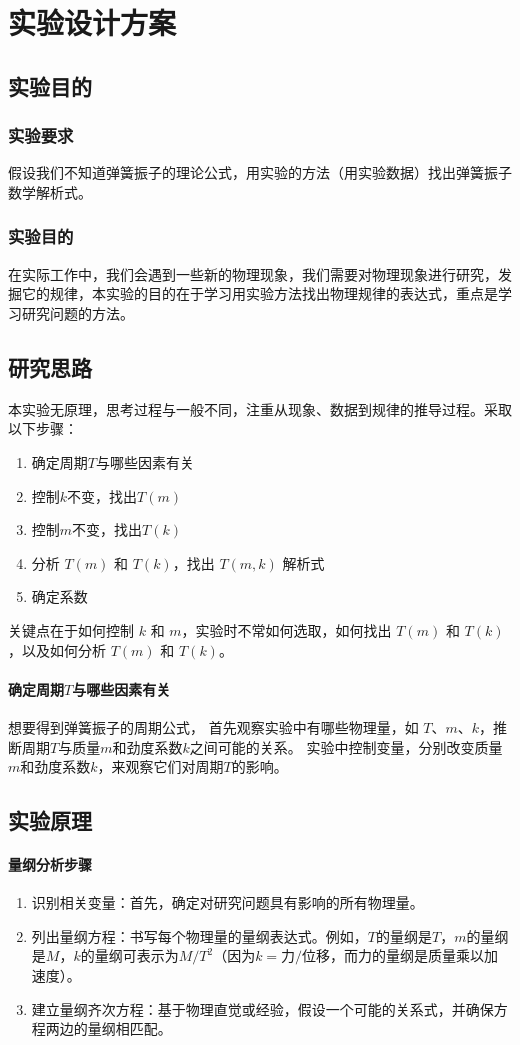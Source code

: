 \documentclass[a4paper,zihao=5,UTF8,fontset=fandol]{../phyreport}
\begin{document}
\phyExpCover
\section{实验设计方案}
\subsection{实验目的}
\subsubsection{实验要求}
假设我们不知道弹簧振子的理论公式，用实验的方法（用实验数据）找出弹簧振子数学解析式。

\subsubsection{实验目的}
在实际工作中，我们会遇到一些新的物理现象，我们需要对物理现象进行研究，发掘它的规律，本实验的目的在于学习用实验方法找出物理规律的表达式，重点是学习研究问题的方法。
\subsection{研究思路}
本实验无原理，思考过程与一般不同，注重从现象、数据到规律的推导过程。采取以下步骤：
\begin{enumerate}
	\item 确定周期$T$与哪些因素有关
	\item 控制$k$不变，找出$T(m)$
	\item 控制$m$不变，找出$T(k)$
	\item 分析 $T(m)$ 和 $T(k)$，找出 $T(m,k)$ 解析式
	\item 确定系数
\end{enumerate}
关键点在于如何控制 $k$ 和 $m$，实验时不常如何选取，如何找出 $T(m)$ 和 $T(k)$，以及如何分析 $T(m)$ 和 $T(k)$。

\paragraph{确定周期$T$与哪些因素有关}

想要得到弹簧振子的周期公式，
首先观察实验中有哪些物理量，如 $T$、$m$、$k$，推断周期$T$与质量$m$和劲度系数$k$之间可能的关系。
实验中控制变量，分别改变质量$m$和劲度系数$k$，来观察它们对周期$T$的影响。

\subsection{实验原理}
\paragraph{量纲分析步骤}
\begin{enumerate}
\item 识别相关变量：首先，确定对研究问题具有影响的所有物理量。
\item 列出量纲方程：书写每个物理量的量纲表达式。例如，$T$的量纲是$T$，$m$的量纲是$M$，$k$的量纲可表示为$M/T^2$（因为$k= \text{力}/\text{位移}$，而力的量纲是质量乘以加速度）。
\item 建立量纲齐次方程：基于物理直觉或经验，假设一个可能的关系式，并确保方程两边的量纲相匹配。
\end{enumerate}
\end{document}
